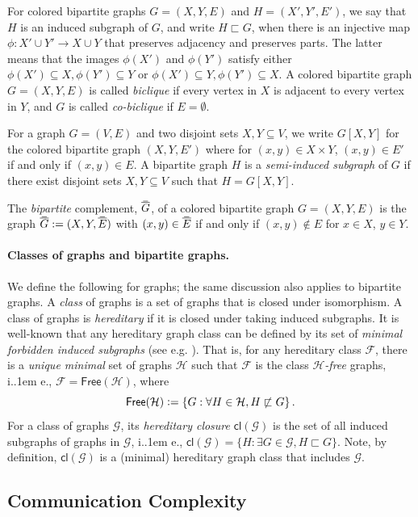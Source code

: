 \documentclass{theoretics}
\makeatletter
\newcommand{\define}{\vcentcolon=}
\newcommand{\cF}{\ensuremath{\mathcal{F}}}
\newcommand{\cG}{\ensuremath{\mathcal{G}}}
\newcommand{\cH}{\ensuremath{\mathcal{H}}}
\newcommand*\ie{i.\kern.1em e.\@\xspace} %
\newcommand\doverline[1]{%
  \setbox0=\hbox{$\!\overline{#1}\!$}%
  \ht0=\dimexpr\ht0-.2ex\relax%
  \,\overline{\copy0}\,%
}
\newcommand{\bc}[1]{\doverline{#1}} %
\newcommand{\cl}{\mathsf{cl}}
\newcommand{\free}{\mathsf{Free}}
\makeatother
\begin{document}
For colored bipartite graphs $G = (X,Y,E)$ and $H = (X',Y',E')$, we say that $H$ is an induced
subgraph of $G$, and write $H \sqsubset G$, when there is an injective map $\phi : X' \cup Y' \to X
\cup Y$ that preserves adjacency and preserves parts. The latter means that the images $\phi(X')$
and $\phi(Y')$ satisfy either $\phi(X') \subseteq X, \phi(Y') \subseteq Y$ or $\phi(X') \subseteq Y,
\phi(Y') \subseteq X$.  A colored bipartite graph $G = (X,Y,E)$ is called \emph{biclique} if every
vertex in $X$ is adjacent to every vertex in $Y$, and $G$ is called \emph{co-biclique} if $E =
\emptyset$.

For a graph $G=(V,E)$ and two disjoint sets $X,Y \subseteq V$, we write $G[X,Y]$ for the colored bipartite graph $(X,Y,E')$ where for $(x,y) \in X \times Y$, $(x,y) \in E'$ if and only if $(x,y) \in E$. A bipartite graph $H$ is a \emph{semi-induced subgraph} of $G$ if there exist disjoint sets $X,Y \subseteq V$ such that $H = G[X,Y]$.

The \emph{bipartite} complement, $\bc{G}$,
of a colored bipartite graph $G=(X,Y,E)$ is the graph $\bc{G} := (X,Y,\bc{E})$ with $(x,y)\in \bc{E}$ if and only if $(x,y)\notin E$ for $x\in X$, $y\in Y$.

\paragraph{Classes of graphs and bipartite graphs.} We define the following for graphs; the same
discussion also applies to bipartite graphs. A \emph{class} of graphs is a set of graphs that is
closed under isomorphism. A class of graphs is \emph{hereditary} if it is closed under taking
induced subgraphs.  It is well-known that any hereditary graph class can be defined by its set of
\emph{minimal forbidden induced subgraphs} (see e.g. \cite[Theorem 2.1.3]{KL15}). That is, for any hereditary class $\cF$, there is a
\emph{unique minimal} set of graphs $\cH$ such that $\cF$ is the class \emph{$\cH$-free} graphs,
\ie, $\cF = \free(\cH)$, where
\[
\free(\cH) \define \{ G : \forall H \in \cH, H \not\sqsubset G \} \,.
\]
For a class of  graphs $\cG$, its \emph{hereditary closure} $\cl(\cG)$ is the set of all induced
subgraphs of graphs in $\cG$, \ie, $\cl(\cG) = \{ H : \exists G \in \cG, H \sqsubset G \}$. Note, by
definition, $\cl(\cG)$ is a (minimal) hereditary graph class that includes $\cG$.






\subsection{Communication Complexity}
\label{section:prelim cc}
\end{document}
